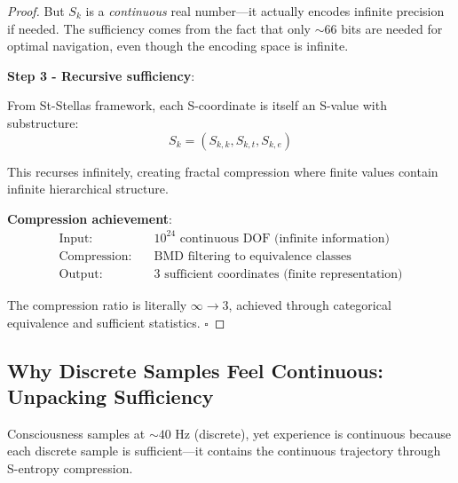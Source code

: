 \begin{proof}
But $S_k$ is a \textit{continuous} real number—it actually encodes infinite precision if needed. The sufficiency comes from the fact that only $\sim 66$ bits are needed for optimal navigation, even though the encoding space is infinite.

\textbf{Step 3 - Recursive sufficiency}:

From St-Stellas framework, each S-coordinate is itself an S-value with substructure:
\begin{equation}
S_k = (S_{k,k}, S_{k,t}, S_{k,e})
\end{equation}

This recurses infinitely, creating fractal compression where finite values contain infinite hierarchical structure.

\textbf{Compression achievement}:
\begin{align}
\text{Input:} \quad &10^{24} \text{ continuous DOF (infinite information)} \\
\text{Compression:} \quad &\text{BMD filtering to equivalence classes} \\
\text{Output:} \quad &3 \text{ sufficient coordinates (finite representation)}
\end{align}

The compression ratio is literally $\infty \to 3$, achieved through categorical equivalence and sufficient statistics. $\square$
\end{proof}

\subsection{Why Discrete Samples Feel Continuous: Unpacking Sufficiency}

\begin{theorem}
\label{thm:continuous_from_discrete}
Consciousness samples at $\sim 40$ Hz (discrete), yet experience is continuous because each discrete sample is sufficient—it contains the continuous trajectory through S-entropy compression.
\end{theorem}

